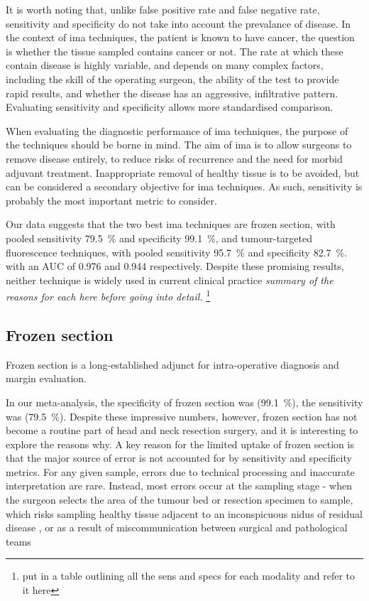 It is worth noting that, unlike false positive rate and false negative rate, sensitivity and specificity do not take into account the prevalance of disease. 
In the context of \gls{ima} techniques, the patient is known to have cancer, the question is whether the tissue sampled contains cancer or not. 
The rate at which these contain disease is highly variable, and depends on many complex factors, including the skill of the operating surgeon, the ability of the test to provide rapid results, and whether the disease has an aggressive, infiltrative pattern.
Evaluating sensitivity and specificity allows more standardised comparison.

When evaluating the diagnostic performance of \gls{ima} techniques, the purpose of the techniques should be borne in mind. 
The aim of \gls{ima} is to allow surgeons to remove disease entirely, to reduce risks of recurrence and the need for morbid adjuvant treatment.
Inappropriate removal of healthy tissue is to be avoided, but can be considered a secondary objective for \gls{ima} techniques.
As such, sensitivity is probably the most important metric to consider.

Our data suggests that the two best \gls{ima} techniques are frozen section, with pooled sensitivity \SI{79.5}{\percent} and specificity \SI{99.1}{\percent}, and tumour-targeted fluorescence techniques, with pooled sensitivity \SI{95.7}{\percent} and specificity \SI{82.7}{\percent}.
with an AUC of 0.976 and 0.944 respectively.
Despite these promising results, neither technique is widely used in current clinical practice
\emph{summary of the reasons for each here before going into detail.}
\footnote{put in a table outlining all the sens and specs for each modality and refer to it here}

\subsection{Frozen section}

Frozen section is a long-established adjunct for intra-operative diagnosis and margin evaluation.

In our meta-analysis, the specificity of frozen section was (\SI{99.1}{\percent}), the sensitivity was (\SI{79.5}{\percent}).
Despite these impressive numbers, however, frozen section has not become a routine part of head and neck resection surgery, and it is interesting to explore the reasons why.
A key reason for the limited uptake of frozen section is that the major source of error is not accounted for by sensitivity and specificity metrics.
For any given sample, errors due to technical processing and inaccurate interpretation are rare.
Instead, most errors occur at the sampling stage - when the surgeon selects the area of the tumour bed or resection specimen to sample, which risks sampling healthy tissue adjacent to an inconspicuous nidus of residual disease \cite{layfieldFrozenSectionEvaluation2018}, or as a result of miscommunication between surgical and pathological teams \cite{blackc.CriticalEvaluationFrozen2006}

